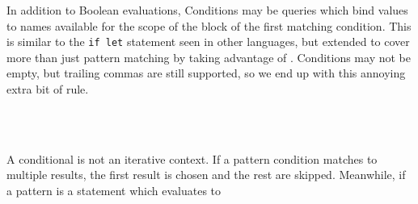 \begin{prooftree}
\end{prooftree}
\begin{prooftree}
\end{prooftree}
\begin{prooftree}
\end{prooftree}
\begin{prooftree}
\end{prooftree}

In addition to Boolean evaluations, Conditions may be queries which bind
values to names available for the scope of the block of the first matching
condition. This is similar to the \texttt{if let} statement seen in other
languages, but extended to cover more than just pattern matching by taking
advantage of \Law{}. Conditions may not be empty, but trailing commas are
still supported, so we end up with this annoying extra bit of rule.

\begin{bnf*}
     \\
     \\
\end{bnf*}

A conditional is not an iterative context. If a pattern condition matches
to multiple results, the first result is chosen and the rest are skipped.
Meanwhile, if a pattern is a statement which evaluates to
